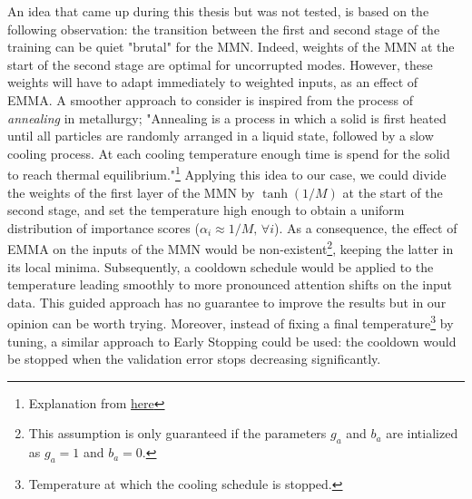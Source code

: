 An idea that came up during this thesis but was not tested, is based on the following observation: the transition between the first and second stage of the training can be quiet "brutal" for the MMN. Indeed, weights of the MMN at the start of the second stage are optimal for uncorrupted modes. However, these weights will have to adapt immediately to weighted inputs, as an effect of EMMA. A smoother approach to consider is inspired from the process of \textit{annealing} in metallurgy; "Annealing is a process in which a solid is first heated until all particles are randomly arranged in a liquid state, followed by a slow cooling process. At each cooling temperature enough time is spend for the solid to reach thermal equilibrium."\footnote{Explanation from \href{http://www.iue.tuwien.ac.at/phd/binder/node87.html}{here}} Applying this idea to our case, we could divide the weights of the first layer of the MMN by $\tanh(1/M)$ at the start of the second stage, and set the temperature high enough to obtain a uniform distribution of importance scores ($\alpha_i \approx 1/M,\, \forall i$). As a consequence, the effect of EMMA on the inputs of the MMN would be non-existent\footnote{This assumption is only guaranteed if the parameters $g_a$ and $b_a$ are intialized as $g_a=1$ and $b_a=0$.}, keeping the latter in its local minima. Subsequently, a cooldown schedule would be applied to the temperature leading smoothly to more pronounced attention shifts on the input data. This guided approach has no guarantee to improve the results but in our opinion can be worth trying. Moreover, instead of fixing a final temperature\footnote{Temperature at which the cooling schedule is stopped.} by tuning, a similar approach to Early Stopping could be used: the cooldown would be stopped when the validation error stops decreasing significantly.

